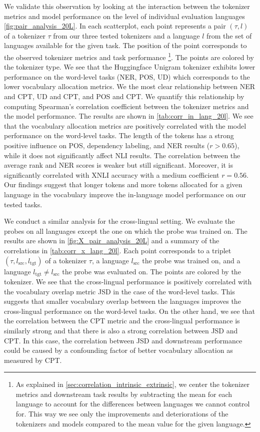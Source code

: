 We validate this observation by looking at the interaction between the tokenizer metrics and model performance on the level of individual evaluation languages \autoref{fig:pair_analysis_20L}. In each scatterplot, each point represents a pair $(\tau, l)$ of a tokenizer $\tau$ from our three tested tokenizers and a language $l$ from the set of languages available for the given task. The position of the point corresponds to the observed tokenizer metrics and task performance \footnote{As explained in \autoref{sec:correlation_intrinsic_extrinsic}, we center the tokenizer metrics and downstream task results by subtracting the mean for each language to account for the differences between languages we cannot control for. This way we see only the improvements and deteriorations of the tokenizers and models compared to the mean value for the given language.}.  The points are colored by the tokenizer type. We see that the Huggingface Unigram tokenizer exhibits lower performance on the word-level tasks (NER, POS, UD) which corresponds to the lower vocabulary allocation metrics. We the most clear relationship between NER and CPT, UD and CPT, and POS and CPT. We quantify this relationship by computing Spearman's correlation coefficient between the tokenizer metrics and the model performance. The results are shown in \autoref{tab:corr_in_lang_20l}. We see that the vocabulary allocation metrics are positively correlated with the model performance on the word-level tasks. The length of the tokens has a strong positive influence on POS, dependency labeling, and NER results ($r > 0.65$), while it does not significantly affect NLI results. The correlation between the average rank and NER scores is weaker but still significant. Moreover, it is significantly correlated with XNLI accuracy with a medium coefficient $r = 0.56$. Our findings suggest that longer tokens and more tokens allocated for a given language in the vocabulary improve the in-language model performance on our tested tasks. 

We conduct a similar analysis for the cross-lingual setting. We evaluate the probes on all languages except the one on which the probe was trained on. The results are shown in \autoref{fig:X_pair_analysis_20L} and a summary of the correlations in \autoref{tab:corr_x_lang_20l}. Each point corresponds to a triplet $(\tau, l_\mathrm{src}, l_\mathrm{tgt})$ of a tokenizer $\tau$, a language $l_\mathrm{src}$ the probe was trained on, and a language $l_\mathrm{tgt} \neq l_\mathrm{src}$ the probe was evaluated on. The points are colored by the tokenizer. We see that the cross-lingual performance is positively correlated with the vocabulary overlap metric JSD in the case of the word-level tasks. This suggests that smaller vocabulary overlap between the languages improves the cross-lingual performance on the word-level tasks. On the other hand, we see that the correlation between the CPT metric and the cross-lingual performance is similarly strong and that there is also a strong correlation between JSD and CPT. In this case, the correlation between JSD and downstream performance could be caused by a confounding factor of better vocabulary allocation as measured by CPT.

